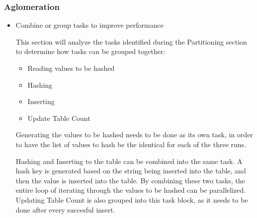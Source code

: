 \documentclass{article}
\begin{document}
\subsubsection{Aglomeration}
        \begin{itemize}
            \item Combine or group tasks to improve performance
            
            This section will analyze the tasks identified during the Partitioning section to determine how tasks can be grouped together: 
            
             \begin{itemize}
		\item Reading values to be hashed
		\item Hashing
		\item Inserting
		\item Update Table Count
	    \end{itemize}
		
		Generating the values to be hashed needs to be done as its own task, in order to have the list of values to hash 
		be the identical for each of the three runs.

		Hashing and Inserting to the table can be combined into the same task. A hash key is generated based on the string 
		being inserted into the table, and then the value is inserted into the table. By combining these two tasks, the 
		entire loop of iterating through the values to be hashed can be parallelized. Updating Table Count is also grouped 
		into this task block, as it needs to be done after every succesful insert.
        \end{itemize}
\end{document}
